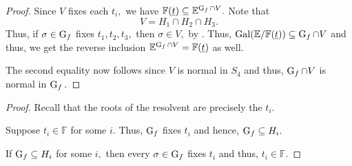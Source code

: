 \galoisintersectklein*\label{prop:galoisintersectklein2}
\begin{flushright}\hyperref[prop:galoisintersectklein]{\upsym}\end{flushright}
\begin{proof}
    Since $V$ fixes each $t_i,$ we have $\mathbb{F}(\underline{t}) \subseteq \mathbb{E}^{\operatorname{G}_f \cap V}.$ Note that 
    \begin{equation*} 
        V = H_1 \cap H_2 \cap H_3.
    \end{equation*}
    Thus, if $\sigma \in \operatorname{G}_f$ fixes $t_1, t_2, t_3,$ then $\sigma \in V,$ by . Thus, $\operatorname{Gal}(\mathbb{E}/\mathbb{F}(\underline{t})) \subseteq \operatorname{G}_f \cap V$ and thus, we get the reverse inclusion $\mathbb{E}^{\operatorname{G}_f \cap V} = \mathbb{F}(\underline{t})$ as well.

    The second equality now follows since $V$ is normal in $S_4$ and thus, $\operatorname{G}_f \cap V$ is normal in $\operatorname{G}_f.$
\end{proof}

\resolventquarticrootinF*\label{prop:resolventquarticrootinF2}
\begin{flushright}\hyperref[prop:resolventquarticrootinF]{\upsym}\end{flushright}
\begin{proof}
    Recall that the roots of the resolvent are precisely the $t_i.$ 

    \forward Suppose $t_i \in \mathbb{F}$ for some $i.$ Thus, $\operatorname{G}_f$ fixes $t_i$ and hence, $\operatorname{G}_f \subseteq H_i.$

    \backward If $\operatorname{G}_f \subseteq H_i$ for some $i,$ then every $\sigma \in \operatorname{G}_f$ fixes $t_i$ and thus, $t_i \in \mathbb{F}.$
\end{proof}

